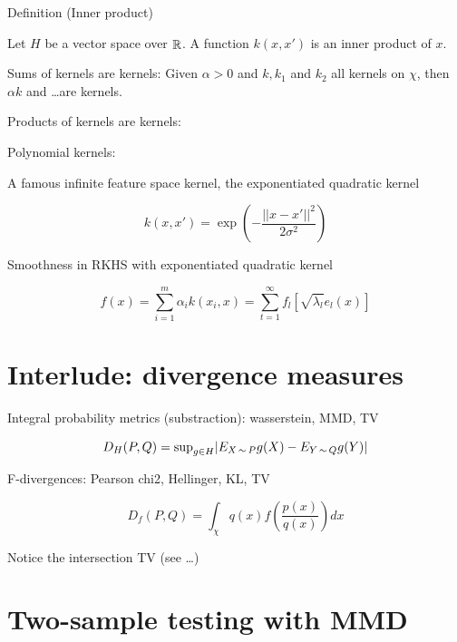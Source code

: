 \documentclass[b5paper]{report}
\begin{document}
Definition (Inner product)

Let $H$ be a vector space over $\operatorname*{\mathbb{\mathop{R}}}$. A function $k(x,x')$ is an inner
product of $x$.

\begin{theorem}
  Sums of kernels are kernels: Given $\alpha > 0$ and $k, k_1$ and $k_2$ all
  kernels on $\chi$, then $\alpha k$ and \dots are kernels.
\end{theorem}

\begin{theorem}
  Products of kernels are kernels:
\end{theorem}

\begin{theorem}
  Polynomial kernels: 
\end{theorem}

A famous infinite feature space kernel, the exponentiated quadratic kernel

\begin{equation}
  k(x, x') = \exp\left(-\frac{||x-x'||^2}{2\sigma^2}\right)
\end{equation}

Smoothness in RKHS with exponentiated quadratic kernel

\begin{equation}
  f(x) = \sum_{i=1}^m \alpha_i k(x_i, x) = \sum_{t=1}^\infty f_l [\sqrt{\lambda_l}e_l(x)]
\end{equation}

\section{Interlude: divergence measures}

Integral probability metrics (substraction): wasserstein, MMD, TV

\begin{equation}
  D_H(P,Q) = \text{sup}_{g \in H} | E_{X \operatorname*{\sim} P}g(X) - E_{Y \operatorname*{\sim} Q}g(Y)|
\end{equation}

F-divergences: Pearson chi2, Hellinger, KL, TV

\begin{equation}
  D_f(P,Q) = \int_\chi q(x) f(\frac{p(x)}{q(x)})dx
\end{equation}

Notice the intersection TV (see \dots)

\section{Two-sample testing with MMD}
\end{document}
